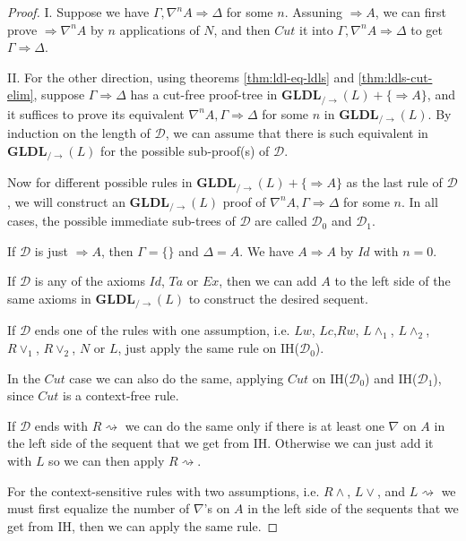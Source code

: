 \documentclass[12pt,a4paper]{article}
\theoremstyle{plain}
\theoremstyle{definition}
\begin{document}
\begin{proof}
	I. Suppose we have $\Gamma, \nabla^n A \Rightarrow \Delta$ for some $n$. Assuning $\Rightarrow A$, we can first prove $\Rightarrow \nabla^n A$ by $n$ applications of $N$, and then $Cut$ it into $\Gamma, \nabla^n A \Rightarrow \Delta$ to get $\Gamma \Rightarrow \Delta$.

	II. For the other direction, using theorems \ref{thm:ldl-eq-ldls} and \ref{thm:ldls-cut-elim}, suppose $\Gamma \Rightarrow \Delta$ has a cut-free proof-tree in $\mathbf{GLDL}_{/\rightarrow}(L)+\{\Rightarrow A\}$, and it suffices to prove its equivalent $\nabla^n A, \Gamma \Rightarrow \Delta$ for some $n$ in $\mathbf{GLDL}_{/\rightarrow}(L)$. By induction on the length of $\mathcal{D}$, we can assume that there is such equivalent in $\mathbf{GLDL}_{/\rightarrow}(L)$ for the possible sub-proof(s) of $\mathcal{D}$.

	Now for different possible rules in $\mathbf{GLDL}_{/\rightarrow}(L)+\{\Rightarrow A\}$ as the last rule of $\mathcal{D}$, we will construct an $\mathbf{GLDL}_{/\rightarrow}(L)$ proof of $\nabla^n A , \Gamma \Rightarrow \Delta$ for some $n$. In all cases, the possible immediate sub-trees of $\mathcal{D}$ are called $\mathcal{D}_0$ and $\mathcal{D}_1$.
	
	If $\mathcal{D}$ is just $\Rightarrow A$, then $\Gamma = \{\}$ and $\Delta = A$. We have $A \Rightarrow A$ by $Id$ with $n = 0$.

	If $\mathcal{D}$ is any of the axioms $Id$, $Ta$ or $Ex$, then we can add $A$ to the left side of the same axioms in $\mathbf{GLDL}_{/\rightarrow}(L)$ to construct the desired sequent.

	If $\mathcal{D}$ ends one of the rules with one assumption, i.e. $Lw$, $Lc$,$Rw$, $L\land_1$, $L\land_2$, $R\lor_1$, $R\lor_2$, $N$ or $L$, just apply the same rule on IH($\mathcal{D}_0$).

	In the $Cut$ case we can also do the same, applying $Cut$ on IH($\mathcal{D}_0$) and IH($\mathcal{D}_1$), since $Cut$ is a context-free rule.

	If $\mathcal{D}$ ends with $R\rightsquigarrow$ we can do the same only if there is at least one $\nabla$ on $A$ in the left side of the sequent that we get from IH. Otherwise we can just add it with $L$ so we can then apply $R\rightsquigarrow$.

	For the context-sensitive rules with two assumptions, i.e. $R\land$, $L\lor$, and $L\rightsquigarrow$ we must first equalize the number of $\nabla$'s on $A$ in the left side of the sequents that we get from IH, then we can apply the same rule.

\end{proof}
\end{document}
